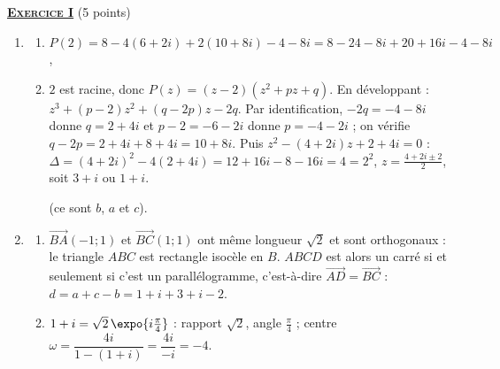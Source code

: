 \providecommand{\Plan}{(\mathscr{P})}
\providecommand{\Ouv}{(O ; \vec{u} , \vec{v})}
\providecommand{\Courbe}{(\mathscr{C})}
\providecommand{\cm}{~\mathrm{cm}}
\providecommand{\dx}{~\mathrm{d}x}
%
\noindent \underline{\textsc{\textbf{Exercice I}}} (5 points)
\begin{enumerate}
   \item
      \begin{enumerate}
         \item {}
            $P(2) = 8 - 4(6 + 2i) + 2(10 + 8i) - 4 - 8i = 8 - 24 - 8i + 20 + 16i - 4 - 8i$, 
         \item {}
            $2$ est racine, donc $P(z) = (z - 2)(z^2 + pz + q)$. En d\'eveloppant :
            $z^3 + (p - 2)z^2 + (q - 2p)z - 2q$. Par identification, $-2q = -4 - 8i$ donne $q = 2 + 4i$ et
            $p - 2 = -6 - 2i$ donne $p = -4 - 2i$ ; on v\'erifie $q - 2p = 2 + 4i + 8 + 4i = 10 + 8i$.
            Puis $z^2 - (4 + 2i)z + 2 + 4i = 0$ : $\Delta = (4 + 2i)^2 - 4(2 + 4i) = 12 + 16i - 8 - 16i = 4 = 2^2$,
            $z = \frac{4 + 2i \pm 2}{2}$, soit $3 + i$ ou $1 + i$.
            \par\noindent{} (ce sont $b$, $a$ et $c$).
      \end{enumerate}
   \item
      \begin{enumerate}
         \item {}
            $\overrightarrow{BA}(-1 ; 1)$ et $\overrightarrow{BC}(1 ; 1)$ ont m\^eme longueur $\sqrt{2}$ et sont orthogonaux :
            le triangle $ABC$ est rectangle isoc\`ele en $B$. $ABCD$ est alors un carr\'e si et seulement si
            c'est un parall\'elogramme, c'est-\`a-dire $\overrightarrow{AD} = \overrightarrow{BC}$ : $d = a + c - b = 1 + i + 3 + i - 2$.
            \par\noindent{}
         \item {}
            $1 + i = \sqrt{2}\,\expo{i\frac{\pi}{4}}$ : rapport $\sqrt{2}$, angle $\frac{\pi}{4}$ ;
            centre $\omega = \dfrac{4i}{1 - (1 + i)} = \dfrac{4i}{-i} = -4$.\par\noindent
            \par\noindent{}


\end{enumerate}
\end{enumerate}
